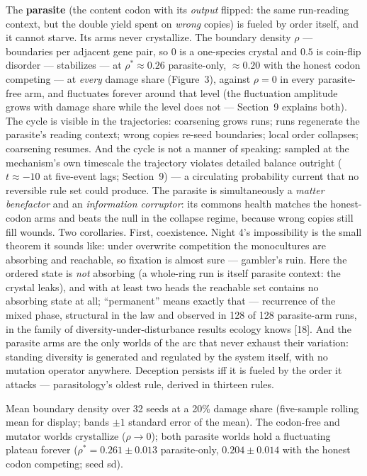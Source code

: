 The {\bf parasite} (the content codon with its {\it output}
flipped: the same run-reading context, but the double yield spent
on {\it wrong} copies) is fueled by order itself, and it cannot
starve. Its arms never crystallize. The boundary density $\rho$
--- boundaries per adjacent gene pair, so $0$ is a one-species
crystal and $0.5$ is coin-flip disorder --- stabilizes --- at $\rho^*\approx0.26$ parasite-only,
$\approx0.20$ with the honest codon competing --- at {\it every}
damage share (Figure~3), against $\rho=0$ in
every parasite-free arm, and fluctuates forever around that level
(the fluctuation amplitude grows with damage share while the level
does not --- Section~9 explains both). The cycle is visible in the
trajectories: coarsening grows runs; runs regenerate the
parasite's reading context; wrong copies re-seed boundaries; local
order collapses; coarsening resumes. And the cycle is not a
manner of speaking: sampled at the mechanism's own timescale the
trajectory violates detailed balance outright ($t\approx-10$ at
five-event lags; Section~9) --- a circulating probability current
that no reversible rule set could produce. The parasite is
simultaneously a {\it matter benefactor} and an {\it information
corruptor}: its commons health matches the honest-codon arms and
beats the null in the collapse regime, because wrong copies still
fill wounds. Two corollaries. First, coexistence. Night 4's impossibility is
the small theorem it sounds like: under overwrite competition the
monocultures are absorbing and reachable, so fixation is almost
sure --- gambler's ruin. Here the ordered state is {\it not}
absorbing (a whole-ring run is itself parasite context: the
crystal leaks), and with at least two heads the reachable set
contains no absorbing state at all; “permanent” means exactly
that --- recurrence of the mixed phase, structural in the law and
observed in 128 of 128 parasite-arm runs, in the family of
diversity-under-disturbance results ecology knows [18]. And the parasite arms are the only worlds of the arc that
never exhaust their variation: standing diversity is generated and
regulated by the system itself, with no mutation operator
anywhere.  Deception persists iff it is fueled by the
order it attacks --- parasitology's oldest rule, derived in
thirteen rules.

\medskip\centerline{\picw=11cm }
\smallskip{} Mean boundary density over 32
seeds at a 20\% damage share (five-sample rolling mean for
display; bands $\pm1$ standard error of the mean). The codon-free
and mutator worlds crystallize ($\rho\to0$); both parasite worlds
hold a fluctuating plateau forever ($\rho^*=0.261\pm0.013$
parasite-only, $0.204\pm0.014$ with the honest codon competing;
seed sd).
\medskip

